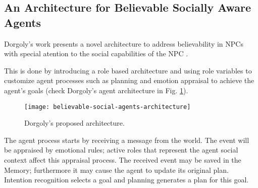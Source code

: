 \subsection{An Architecture for Believable Socially Aware Agents}
Dorgoly's work presents a novel architecture to address believability in \ac{NPC}s with special atention to the social capabilities of the \ac{NPC} \cite{dorgoly:social-agents}.

This is done by introducing a role based architecture and using role variables to customize agent processes such as planning and emotion appraisal to achieve the agent's goals (check Dorgoly's agent architecture in Fig. \ref{fig:believable-social-agents-architecture}).

\begin{figure}
  \centering
    \texttt{[image: believable-social-agents-architecture]}
  \caption{Dorgoly's proposed architecture.}
  \label{fig:believable-social-agents-architecture}
\end{figure}

The agent process starts by receiving a message from the world.
The event will be appraised by emotional rules; active roles that represent the agent social context affect this appraisal process.
The received event may be saved in the Memory; furthermore it may cause the agent to update its original plan.
Intention recognition selects a goal and planning generates a plan for this goal.

